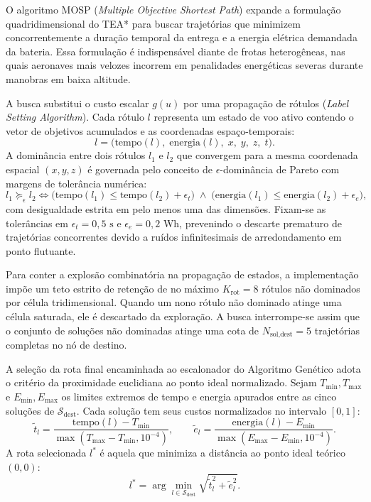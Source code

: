 O algoritmo MOSP (\textit{Multiple Objective Shortest Path}) expande a formulação quadridimensional do TEA* para buscar trajetórias que minimizem concorrentemente a duração temporal da entrega e a energia elétrica demandada da bateria. Essa formulação é indispensável diante de frotas heterogêneas, nas quais aeronaves mais velozes incorrem em penalidades energéticas severas durante manobras em baixa altitude.

A busca substitui o custo escalar $g(u)$ por uma propagação de rótulos (\textit{Label Setting Algorithm}). Cada rótulo $l$ representa um estado de voo ativo contendo o vetor de objetivos acumulados e as coordenadas espaço-temporais:
\begin{equation}\label{eq:definicao_rotulo}
l = \big( \text{tempo}(l), \; \text{energia}(l), \; x, \; y, \; z, \; t \big).
\end{equation}
A dominância entre dois rótulos $l_1$ e $l_2$ que convergem para a mesma coordenada espacial $(x, y, z)$ é governada pelo conceito de $\epsilon$-dominância de Pareto com margens de tolerância numérica:
\begin{equation}\label{eq:epsilon_dominancia}
l_1 \succeq_\epsilon l_2 \iff \big(\text{tempo}(l_1) \le \text{tempo}(l_2) + \epsilon_t\big) \;\land\; \big(\text{energia}(l_1) \le \text{energia}(l_2) + \epsilon_e\big),
\end{equation}
com desigualdade estrita em pelo menos uma das dimensões. Fixam-se as tolerâncias em $\epsilon_t = 0{,}5\text{ s}$ e $\epsilon_e = 0{,}2\text{ Wh}$, prevenindo o descarte prematuro de trajetórias concorrentes devido a ruídos infinitesimais de arredondamento em ponto flutuante.

Para conter a explosão combinatória na propagação de estados, a implementação impõe um teto estrito de retenção de no máximo $K_{\text{rot}} = 8$ rótulos não dominados por célula tridimensional. Quando um nono rótulo não dominado atinge uma célula saturada, ele é descartado da exploração. A busca interrompe-se assim que o conjunto de soluções não dominadas atinge uma cota de $N_{\text{sol,dest}} = 5$ trajetórias completas no nó de destino.

A seleção da rota final encaminhada ao escalonador do Algoritmo Genético adota o critério da proximidade euclidiana ao ponto ideal normalizado. Sejam $T_{\text{min}}, T_{\text{max}}$ e $E_{\text{min}}, E_{\text{max}}$ os limites extremos de tempo e energia apurados entre as cinco soluções de $\mathcal{S}_{\text{dest}}$. Cada solução tem seus custos normalizados no intervalo $[0, 1]$:
\begin{equation}\label{eq:normalizacao_mosp}
\tilde{t}_l = \frac{\text{tempo}(l) - T_{\text{min}}}{\max(T_{\text{max}} - T_{\text{min}}, 10^{-4})}, \qquad \tilde{e}_l = \frac{\text{energia}(l) - E_{\text{min}}}{\max(E_{\text{max}} - E_{\text{min}}, 10^{-4})}.
\end{equation}
A rota selecionada $l^*$ é aquela que minimiza a distância ao ponto ideal teórico $(0, 0)$:
\begin{equation}\label{eq:selecao_ponto_ideal}
l^* = \arg\min_{l \in \mathcal{S}_{\text{dest}}} \sqrt{\tilde{t}_l^2 + \tilde{e}_l^2}.
\end{equation}

